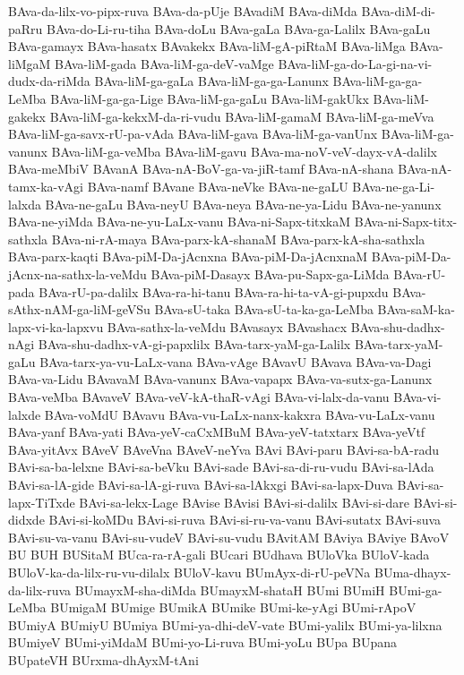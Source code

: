 {BAva-da-lilx-vo-pipx-ruva
BAva-da-pUje
BAvadiM
BAva-diMda
BAva-diM-di-paRru
BAva-do-Li-ru-tiha
BAva-doLu
BAva-gaLa
BAva-ga-Lalilx
BAva-gaLu
BAva-gamayx
BAva-hasatx
BAvakekx
BAva-liM-gA-piRtaM
BAva-liMga
BAva-liMgaM
BAva-liM-gada
BAva-liM-ga-deV-vaMge
BAva-liM-ga-do-La-gi-na-vi-dudx-da-riMda
BAva-liM-ga-gaLa
BAva-liM-ga-ga-Lanunx
BAva-liM-ga-ga-LeMba
BAva-liM-ga-ga-Lige
BAva-liM-ga-gaLu
BAva-liM-gakUkx
BAva-liM-gakekx
BAva-liM-ga-kekxM-da-ri-vudu
BAva-liM-gamaM
BAva-liM-ga-meVva
BAva-liM-ga-savx-rU-pa-vAda
BAva-liM-gava
BAva-liM-ga-vanUnx
BAva-liM-ga-vanunx
BAva-liM-ga-veMba
BAva-liM-gavu
BAva-ma-noV-veV-dayx-vA-dalilx
BAva-meMbiV
BAvanA
BAva-nA-BoV-ga-va-jiR-tamf
BAva-nA-shana
BAva-nA-tamx-ka-vAgi
BAva-namf
BAvane
BAva-neVke
BAva-ne-gaLU
BAva-ne-ga-Li-lalxda
BAva-ne-gaLu
BAva-neyU
BAva-neya
BAva-ne-ya-Lidu
BAva-ne-yanunx
BAva-ne-yiMda
BAva-ne-yu-LaLx-vanu
BAva-ni-Sapx-titxkaM
BAva-ni-Sapx-titx-sathxla
BAva-ni-rA-maya
BAva-parx-kA-shanaM
BAva-parx-kA-sha-sathxla
BAva-parx-kaqti
BAva-piM-Da-jAcnxna
BAva-piM-Da-jAcnxnaM
BAva-piM-Da-jAcnx-na-sathx-la-veMdu
BAva-piM-Dasayx
BAva-pu-Sapx-ga-LiMda
BAva-rU-pada
BAva-rU-pa-dalilx
BAva-ra-hi-tanu
BAva-ra-hi-ta-vA-gi-pupxdu
BAva-sAthx-nAM-ga-liM-geVSu
BAva-sU-taka
BAva-sU-ta-ka-ga-LeMba
BAva-saM-ka-lapx-vi-ka-lapxvu
BAva-sathx-la-veMdu
BAvasayx
BAvashacx
BAva-shu-dadhx-nAgi
BAva-shu-dadhx-vA-gi-papxlilx
BAva-tarx-yaM-ga-Lalilx
BAva-tarx-yaM-gaLu
BAva-tarx-ya-vu-LaLx-vana
BAva-vAge
BAvavU
BAvava
BAva-va-Dagi
BAva-va-Lidu
BAvavaM
BAva-vanunx
BAva-vapapx
BAva-va-sutx-ga-Lanunx
BAva-veMba
BAvaveV
BAva-veV-kA-thaR-vAgi
BAva-vi-lalx-da-vanu
BAva-vi-lalxde
BAva-voMdU
BAvavu
BAva-vu-LaLx-nanx-kakxra
BAva-vu-LaLx-vanu
BAva-yanf
BAva-yati
BAva-yeV-caCxMBuM
BAva-yeV-tatxtarx
BAva-yeVtf
BAva-yitAvx
BAveV
BAveVna
BAveV-neYva
BAvi
BAvi-paru
BAvi-sa-bA-radu
BAvi-sa-ba-lelxne
BAvi-sa-beVku
BAvi-sade
BAvi-sa-di-ru-vudu
BAvi-sa-lAda
BAvi-sa-lA-gide
BAvi-sa-lA-gi-ruva
BAvi-sa-lAkxgi
BAvi-sa-lapx-Duva
BAvi-sa-lapx-TiTxde
BAvi-sa-lekx-Lage
BAvise
BAvisi
BAvi-si-dalilx
BAvi-si-dare
BAvi-si-didxde
BAvi-si-koMDu
BAvi-si-ruva
BAvi-si-ru-va-vanu
BAvi-sutatx
BAvi-suva
BAvi-su-va-vanu
BAvi-su-vudeV
BAvi-su-vudu
BAvitAM
BAviya
BAviye
BAvoV
BU
BUH
BUSitaM
BUca-ra-rA-gali
BUcari
BUdhava
BUloVka
BUloV-kada
BUloV-ka-da-lilx-ru-vu-dilalx
BUloV-kavu
BUmAyx-di-rU-peVNa
BUma-dhayx-da-lilx-ruva
BUmayxM-sha-diMda
BUmayxM-shataH
BUmi
BUmiH
BUmi-ga-LeMba
BUmigaM
BUmige
BUmikA
BUmike
BUmi-ke-yAgi
BUmi-rApoV
BUmiyA
BUmiyU
BUmiya
BUmi-ya-dhi-deV-vate
BUmi-yalilx
BUmi-ya-lilxna
BUmiyeV
BUmi-yiMdaM
BUmi-yo-Li-ruva
BUmi-yoLu
BUpa
BUpana
BUpateVH
BUrxma-dhAyxM-tAni
}
